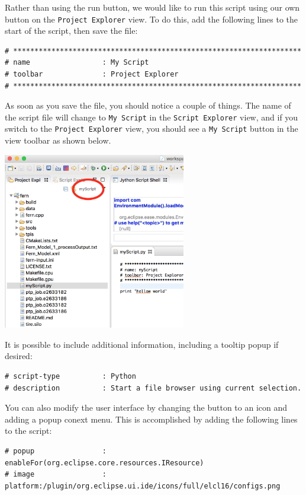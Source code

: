 Rather than using the run button, we would like to run this script using our own
button on the \texttt{Project Explorer} view. To do this, add the following
lines to the start of the script, then save the file:

{\small
\begin{verbatim}
# ********************************************************************  
# name                 : My Script 
# toolbar              : Project Explorer  
# ******************************************************************** 
\end{verbatim}
}

As soon as you save the file, you should notice a couple of things. The name of
the script file will change to \texttt{My Script} in the \texttt{Script
Explorer} view, and if you switch to the \texttt{Project Explorer} view, you
should see a \texttt{My Script} button in the view toolbar as shown below.

\begin{center} \includegraphics[width=8cm]{images/scriptButton}
\end{center}

It is possible to include additional information, including a tooltip popup
if desired:

{\small
\begin{verbatim}
# script-type          : Python  
# description          : Start a file browser using current selection.  
\end{verbatim}
}

You can also modify the user interface by changing the button to
an icon and adding a popup conext menu. This is accomplished by adding the following lines
to the script:

{\small
\begin{verbatim}
# popup				   : enableFor(org.eclipse.core.resources.IResource) 
# image				   : platform:/plugin/org.eclipse.ui.ide/icons/full/elcl16/configs.png
\end{verbatim}
}


